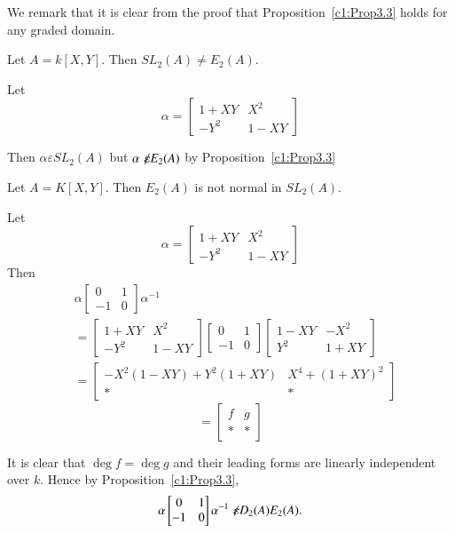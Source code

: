 We remark that it is clear from the proof that
Proposition~\ref{c1:Prop3.3} holds for any graded domain.

\begin{coro}\label{c1:coro3.5}
Let $A=k[X,Y]$. Then $SL_2(A)\neq E_2(A)$.
\end{coro}

\begin{Proof}
Let 
$$
\alpha=
\begin{bmatrix}
1+XY & X^{2}\\
-Y^{2} & 1-XY
\end{bmatrix}
$$

Then $\alpha \varepsilon SL_2(A)$ but $\alpha \not\kern-2pt\varepsilon E_2(A)$ by Proposition~\ref{c1:Prop3.3}
\enprf
\end{Proof}


\begin{coro}\label{c1:coro3.6}
Let $A=K[X,Y]$. Then $E_2(A)$ is not normal in $SL_2(A)$. 
\end{coro}

\begin{Proof}
Let 
$$
\alpha=
\begin{bmatrix}
1+XY & X^{2}\\
-Y^{2} & 1-XY
\end{bmatrix}
$$
Then
\begin{align*}
&\alpha  \begin{bmatrix}
0 & 1\\
-1 & 0
\end{bmatrix} \alpha^{-1}\\
&= \begin{bmatrix}
1+XY & X^{2}\\
-Y^{2}& 1-XY
\end{bmatrix} \begin{bmatrix}
0 & 1\\
-1 & 0
\end{bmatrix} \begin{bmatrix}
1-XY & -X^{2}\\
Y^{2} & 1+XY
\end{bmatrix}\\
&= \begin{bmatrix}
-X^{2}(1-XY)+Y^{2}(1+XY) & X^{4}+(1+XY)^{2}\\
\ast & \ast
\end{bmatrix}
\end{align*}
$$
=
\begin{bmatrix}
f & g\\
\ast & \ast
\end{bmatrix}
$$

It is clear that $\deg f=\deg g$ and their leading forms are linearly
independent over $k$. Hence by Proposition~\ref{c1:Prop3.3}, 
$$
\alpha
\begin{bmatrix}
0 & 1\\
-1 & 0
\end{bmatrix} \alpha^{-1}\not\kern-2pt\varepsilon D_2(A)E_2(A).
$$
\enprf
\end{Proof}


